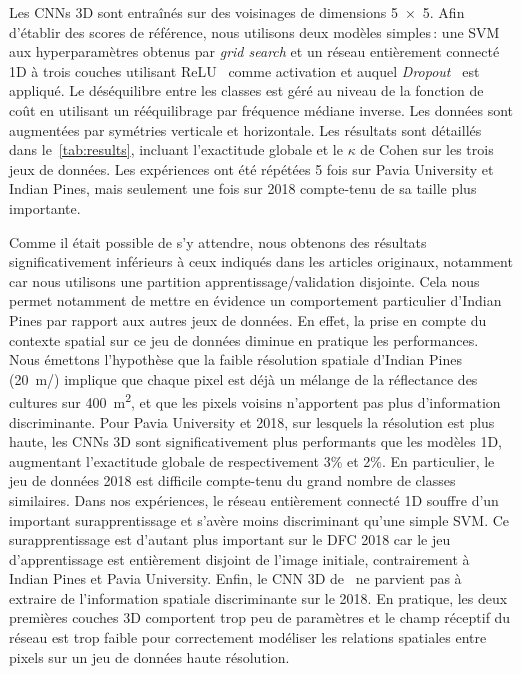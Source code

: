 Les \glspl{CNN} 3D sont entraînés sur des voisinages de dimensions \num{5x5}. Afin d'établir des scores de référence, nous utilisons deux modèles simples\,: une \gls{SVM} aux hyperparamètres obtenus par \emph{grid search} et un réseau entièrement connecté 1D à trois couches utilisant \gls{ReLU}~\cite{nair_rectified_2010} comme activation et auquel \emph{Dropout}~\cite{srivastava_dropout_2014} est appliqué. Le déséquilibre entre les classes est géré au niveau de la fonction de coût en utilisant un rééquilibrage par fréquence médiane inverse. Les données sont augmentées par symétries verticale et horizontale. Les résultats sont détaillés dans le~\cref{tab:results}, incluant l'exactitude globale et le $\kappa$ de Cohen sur les trois jeux de données. Les expériences ont été répétées 5 fois sur Pavia University et Indian Pines, mais seulement une fois sur  2018 compte-tenu de sa taille plus importante.

Comme il était possible de s'y attendre, nous obtenons des résultats significativement inférieurs à ceux indiqués dans les articles originaux, notamment car nous utilisons une partition apprentissage/validation disjointe. Cela nous permet notamment de mettre en évidence un comportement particulier d'Indian Pines par rapport aux autres jeux de données. En effet, la prise en compte du contexte spatial sur ce jeu de données diminue en pratique les performances. Nous émettons l'hypothèse que la faible résolution spatiale d'Indian Pines (\SI{20}{\meter/\px}) implique que chaque pixel est déjà un mélange de la réflectance des cultures sur \SI{400}{\meter\squared}, et que les pixels voisins n'apportent pas plus d'information discriminante.  Pour Pavia University et  2018, sur lesquels la résolution est plus haute, les \glspl{CNN} 3D sont significativement plus performants que les modèles 1D, augmentant l'exactitude globale de respectivement 3\% et 2\%. En particulier, le jeu de données  2018 est difficile compte-tenu du grand nombre de classes similaires. Dans nos expériences, le réseau entièrement connecté 1D souffre d'un important surapprentissage et s'avère moins discriminant qu'une simple \gls{SVM}. Ce surapprentissage est d'autant plus important sur le DFC 2018 car le jeu d'apprentissage est entièrement disjoint de l'image initiale, contrairement à Indian Pines et Pavia University. Enfin, le \gls{CNN} 3D de~\citet{ben_hamida_deep_2016} ne parvient pas à extraire de l'information spatiale discriminante sur le  2018. En pratique, les deux premières couches 3D comportent trop peu de paramètres et le champ réceptif du réseau est trop faible pour correctement modéliser les relations spatiales entre pixels sur un jeu de données haute résolution.

